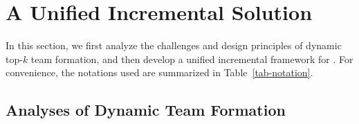 \newcommand{\changedinc}{\kw{Changed}}
\newcommand{\cut}{\kw{CUT}}
\newcommand{\imr}{\kw{IMR}}
\newcommand{\imrs}{\kw{IMRs}}
\newcommand{\fb}{\kw{FBM}}
\newcommand{\bs}{\kw{BS}}
\newcommand{\fs}{\kw{FS}}
\newcommand{\bfc}{\kw{BF}}
\newcommand{\upl}{\kw{UP}}
\newcommand{\fbmatstruct}{\kw{FBMatStruct}}
\newcommand{\matchindex}{\kw{MatStaIndex}}
\newcommand{\matchimr}{\kw{MatchIMR}}
\newcommand{\for}{\kw{FOR}}
\newcommand{\while}{\kw{WHIlE}}
\newcommand{\allmatch}{\kw{mat}}
\newcommand{\affnode}{\kw{affnode}}

\newcommand{\ms}{\kw{SHOUDfs}}
\newcommand{\ballfilter}{\kw{SHOUDbfc}}

\newcommand{\dens}{\kw{den}}
\newcommand{\identifyaffball}{\kw{IdABall}}
\newcommand{\patedgeinsert}{\kw{patEIns}}
\newcommand{\incmatch}{\kw{IncMatch}}
\newcommand{\wmatchindex}{\kw{wMatStaCode}}
\newcommand{\cflag}{\kw{cflag}}
\newcommand{\dflag}{\kw{dflag}}
\newcommand{\gflag}{\kw{gflag}}
\newcommand{\rflag}{\kw{rflag}}

\newcommand{\incgrpat}{\kw{kPatIncGPM}}
\newcommand{\incgrdata}{\kw{kDataIncGPM}}
\newcommand{\dyngr}{\kw{kDynGPM}}
\newcommand{\affballx}{\kw{AffB}}
\newcommand{\affballsx}{\kw{AffBs}}
\newcommand{\affballacc}{\kw{AffBall^{acc}}}
\newcommand{\affballaccs}{\kw{AffBalls^{acc}}}
\newcommand{\affballimr}{\kw{AffBall^{imr}}}
\newcommand{\affballimrs}{\kw{AffBalls^{imr}}}
\newcommand{\patinc}{\kw{dynamicPG}}
\newcommand{\datainc}{\kw{dynamicDG}}
\newcommand{\optpatinc}{\kw{SHOULDoptinc}}
\newcommand{\inc}{\kw{dynamic}}
\newcommand{\matchs}{\kw{R}}
\newcommand{\comb}{\kw{combine}}
\newcommand{\optinc}{\kw{optDynamic}}

\newcommand{\incp}{\kw{dynamicP}}
\newcommand{\incd}{\kw{dynamicG}}


\section{A Unified Incremental Solution}
\label{sec-dynamictopk}

In this section, we first analyze the challenges and design principles of dynamic top-$k$ team formation,
and then develop a unified incremental framework for \dynteamF.
For convenience, the notations used are summarized in Table~\ref{tab-notation}.


\subsection{Analyses of Dynamic Team Formation}

